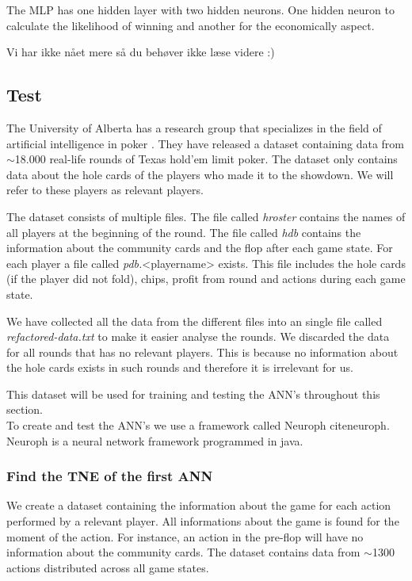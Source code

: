 The MLP has one hidden layer with two hidden neurons. One hidden neuron to calculate the likelihood of winning and another for the economically aspect.



Vi har ikke nået mere så du behøver ikke læse videre :)

\subsection{Test}
\label{sec:default-test}

The University of Alberta has a research group that specializes in the field of artificial intelligence in poker \cite{alberta}. They have released a dataset containing data from $\sim$18.000 real-life rounds of Texas hold'em limit poker. The dataset only contains data about the hole cards of the players who made it to the showdown. We will refer to these players as relevant players.

The dataset consists of multiple files. The file called \textit{hroster} contains the names of all players at the beginning of the round. The file called \textit{hdb} contains the information about the community cards and the flop after each game state. For each player a file called \textit{pdb.}<playername> exists. This file includes the hole cards (if the player did not fold), chips, profit from round and actions during each game state. 

We have collected all the data from the different files into an single file called \textit{refactored-data.txt} to make it easier analyse the rounds. We discarded the data for all rounds that has no relevant players. This is because no information about the hole cards exists in such rounds and therefore it is irrelevant for us. 

This dataset will be used for training and testing the ANN's throughout this section.\\

To create and test the ANN's we use a framework called Neuroph cite{neuroph}. Neuroph is a neural network framework programmed in java. 

\subsubsection{Find the TNE of the first ANN}
\label{sec:ann-test1}
We create a dataset containing the information about the game for each action performed by a relevant player. All informations about the game is found for the moment of the action. For instance, an action in the pre-flop will have no information about the community cards.
The dataset contains data from $\sim$1300 actions distributed across all game states.

